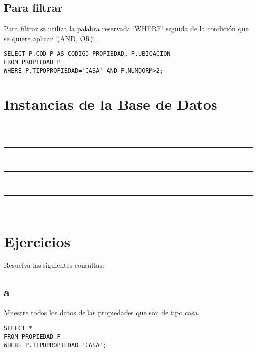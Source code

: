 \documentclass{templateNote}
\begin{document}
\subsection{Para filtrar}
\indent
Para filtrar se utiliza la palabra reservada `WHERE` seguida de la condición que se quiere aplicar `(AND, OR)`.
\begin{tcolorbox}
    [colback=gray!5!white,colframe=gray!75!black,fonttitle=\bfseries,title=SQL]
    \begin{sqlcode}
    \end{sqlcode}
    \begin{verbatim}
SELECT P.COD_P AS CODIGO_PROPIEDAD, P.UBICACION
FROM PROPIEDAD P
WHERE P.TIPOPROPIEDAD='CASA' AND P.NUMDORM>2;
    \end{verbatim}
\end{tcolorbox}

\newpage
\section{Instancias de la Base de Datos}
\begin{samepage}
    \rule{\linewidth}{0.2 mm}\\[-0.4 cm]
    \rule{\linewidth}{0.2 mm}\\[-0.4 cm]
    \rule{\linewidth}{0.2 mm}\\[-0.4 cm]
    \rule{\linewidth}{0.2 mm}\\[-0.4 cm]
\end{samepage}

\newpage
\section{Ejercicios}
\indent
Resuelva las siguientes consultas:

\subsection{a}
\indent
Muestre todos los datos de las propiedades que son de tipo casa.
\begin{tcolorbox}
    [colback=gray!5!white,colframe=gray!75!black,fonttitle=\bfseries,title=SQL]
    \begin{sqlcode}
    \end{sqlcode}
    \begin{verbatim}
SELECT * 
FROM PROPIEDAD P
WHERE P.TIPOPROPIEDAD='CASA';
    \end{verbatim}
\end{tcolorbox}
\end{document}
